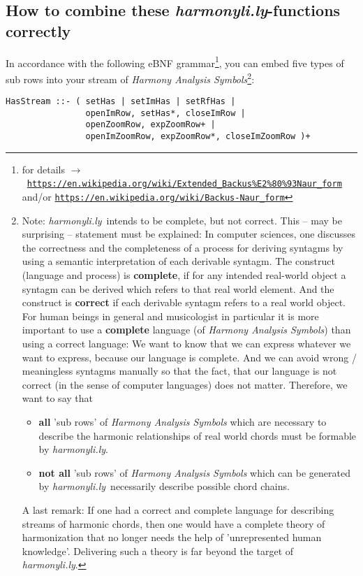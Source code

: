 \documentclass[
  DIV=calc,
  BCOR=5mm,
  12pt,
  headings=small,
  oneside,
  abstract=true,
  toc=bib,
  xcolor=dvipsnames,
  openany,
  english]{scrartcl}
\newcommand{\ra}[0]{$\rightarrow$}
\newcommand{\lnka}[1]{\href{#1}{\texttt{#1}}}
\newcommand{\hlyn}[0]{\textit{harmonyli.ly}}
\newcommand{\has}[1]{\textit{Harmony Analysis Symbol#1}}
\begin{document}
\subsection{How to combine these \hlyn-functions correctly}

In accordance with the following eBNF
grammar\footnote{for details \ra\
\lnka{https://en.wikipedia.org/wiki/Extended\_Backus\%E2\%80\%93Naur\_form}
and/or \lnka{https://en.wikipedia.org/wiki/Backus-Naur\_form}
}, you can embed five types of sub rows
into your stream of \has{s}\footnote{Note: \hlyn\ intends to be complete, but
not correct. This -- may be surprising -- statement must be explained: In
computer sciences, one discusses the correctness and the completeness of a
process for deriving syntagms by using a semantic interpretation of each
derivable syntagm. The construct (language and process) is \textbf{complete}, if
for any intended real-world object a syntagm can be derived which refers to that
real world element. And the construct is \textbf{correct} if each derivable
syntagm refers to a real world object. For human beings in general and
musicologist in particular it is more important to use a \textbf{complete}
language (of \has{s}) than using a correct language: We want to know that
we can express whatever we want to express, because our language is complete.
And we can avoid wrong / meaningless syntagms manually so that the fact, that
our language is not correct (in the sense of computer languages) does not
matter. Therefore, we want to say that
\begin{itemize}
  \item \textbf{all} 'sub rows' of \has{s} which are necessary to describe the
  harmonic relationships of real world chords must be formable by \hlyn.
  \item \textbf{not all} 'sub rows' of \has{s} which can be generated by \hlyn\
  necessarily describe possible chord chains.
\end{itemize}
A last remark: If one had a correct and complete language for describing streams
of harmonic chords, then one would have a complete theory of harmonization
that no longer needs the help of 'unrepresented human knowledge'.
Delivering such a theory is far beyond the target of \hlyn.
}:

\begin{verbatim}
HasStream ::- ( setHas | setImHas | setRfHas |
                openImRow, setHas*, closeImRow |
                openZoomRow, expZoomRow+ |
                openImZoomRow, expZoomRow*, closeImZoomRow )+
\end{verbatim}
\end{document}
